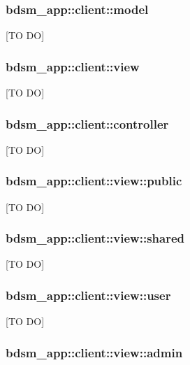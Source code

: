 	\subsubsection{bdsm\_app::client::model} %
	\label{ssub:bdsm_app_client_model}
	[TO DO]

	\subsubsection{bdsm\_app::client::view} %
	\label{ssub:bdsm_app_client_view}
	[TO DO]

	\subsubsection{bdsm\_app::client::controller} %
	\label{ssub:bdsm_app_client_controller}
	[TO DO]



	\subsubsection{bdsm\_app::client::view::public} %
	\label{ssub:bdsm_app_client_view_public}
	[TO DO]

	\subsubsection{bdsm\_app::client::view::shared} %
	\label{ssub:bdsm_app_client_view_shared}
	[TO DO]

	\subsubsection{bdsm\_app::client::view::user} %
	\label{ssub:bdsm_app_client_view_user}
	[TO DO]

	\subsubsection{bdsm\_app::client::view::admin} %
	\label{ssub:bdsm_app_client_view_admin}
	




